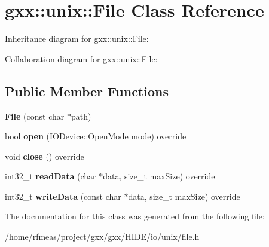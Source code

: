 \hypertarget{classgxx_1_1unix_1_1File}{}\section{gxx\+:\+:unix\+:\+:File Class Reference}
\label{classgxx_1_1unix_1_1File}


Inheritance diagram for gxx\+:\+:unix\+:\+:File\+:


Collaboration diagram for gxx\+:\+:unix\+:\+:File\+:
\subsection*{Public Member Functions}
\begin{DoxyCompactItemize}
\item 
{\bfseries File} (const char $\ast$path)\hypertarget{classgxx_1_1unix_1_1File_a01670a8933f5d450c1edece6ee8838d1}{}\label{classgxx_1_1unix_1_1File_a01670a8933f5d450c1edece6ee8838d1}

\item 
bool {\bfseries open} (I\+O\+Device\+::\+Open\+Mode mode) override\hypertarget{classgxx_1_1unix_1_1File_af9461e66b78ca06bf9e3c78d70401ec9}{}\label{classgxx_1_1unix_1_1File_af9461e66b78ca06bf9e3c78d70401ec9}

\item 
void {\bfseries close} () override\hypertarget{classgxx_1_1unix_1_1File_a1c2e09c23ea1faa125f02f76cfd73c7e}{}\label{classgxx_1_1unix_1_1File_a1c2e09c23ea1faa125f02f76cfd73c7e}

\item 
int32\+\_\+t {\bfseries read\+Data} (char $\ast$data, size\+\_\+t max\+Size) override\hypertarget{classgxx_1_1unix_1_1File_abb16d4d949f169e0c447893882d4379a}{}\label{classgxx_1_1unix_1_1File_abb16d4d949f169e0c447893882d4379a}

\item 
int32\+\_\+t {\bfseries write\+Data} (const char $\ast$data, size\+\_\+t max\+Size) override\hypertarget{classgxx_1_1unix_1_1File_a68ab127b61f040ea437c238e7ee7eb91}{}\label{classgxx_1_1unix_1_1File_a68ab127b61f040ea437c238e7ee7eb91}

\end{DoxyCompactItemize}


The documentation for this class was generated from the following file\+:\begin{DoxyCompactItemize}
\item 
/home/rfmeas/project/gxx/gxx/\+H\+I\+D\+E/io/unix/file.\+h\end{DoxyCompactItemize}
